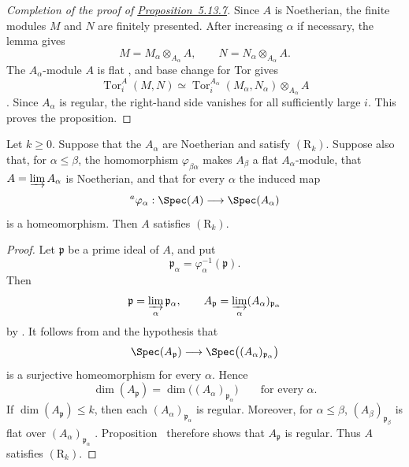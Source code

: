 \begin{proof}[Completion of the proof of {\hyperlink{ega4.c04.prop.5-13-7}{Proposition~5.13.7}}]
Since $A$ is Noetherian, the finite modules $M$ and $N$ are
finitely presented.  After increasing $\alpha$ if necessary, the
lemma gives
\[
  M=M_\alpha\otimes_{A_\alpha}A,
  \qquad
  N=N_\alpha\otimes_{A_\alpha}A.
\]
The $A_\alpha$-module $A$ is flat , and base
change for Tor gives
\[
  \operatorname{Tor}^{A}_i(M,N)
  \simeq
  \operatorname{Tor}^{A_\alpha}_i(M_\alpha,N_\alpha)
  \otimes_{A_\alpha}A
\]
.  Since $A_\alpha$ is regular, the
right-hand side vanishes for all sufficiently large $i$.  This
proves the proposition.
\end{proof}

\begin{corollary}[5.13.8]
\label{IV.5.13.8}
Let $k\geq0$.  Suppose that the $A_\alpha$ are Noetherian and
satisfy $(\mathrm R_k)$.  Suppose also that, for
$\alpha\leq\beta$, the homomorphism $\varphi_{\beta\alpha}$
makes $A_\beta$ a flat $A_\alpha$-module, that
$A=\varinjlim A_\alpha$ is Noetherian, and that for every
$\alpha$ the induced map
\[
  {}^{a}\varphi_\alpha:
  \Spec(A)\longrightarrow\Spec(A_\alpha)
\]
is a homeomorphism.  Then $A$ satisfies $(\mathrm R_k)$.
\end{corollary}

\begin{proof}
Let $\mathfrak p$ be a prime ideal of $A$, and put
\[
  \mathfrak p_\alpha
  =\varphi_\alpha^{-1}(\mathfrak p).
\]
Then
\[
  \mathfrak p=\varinjlim_\alpha\mathfrak p_\alpha,
  \qquad
  A_{\mathfrak p}
  =\varinjlim_\alpha(A_\alpha)_{\mathfrak p_\alpha}
\]
by .  It follows from
 and the hypothesis that
\[
  \Spec(A_{\mathfrak p})
  \longrightarrow
  \Spec\bigl((A_\alpha)_{\mathfrak p_\alpha}\bigr)
\]
is a surjective homeomorphism for every $\alpha$.  Hence
\[
  \dim(A_{\mathfrak p})
  =
  \dim\bigl((A_\alpha)_{\mathfrak p_\alpha}\bigr)
  \qquad\text{for every }\alpha.
\]
If $\dim(A_{\mathfrak p})\leq k$, then each
$(A_\alpha)_{\mathfrak p_\alpha}$ is regular.  Moreover, for
$\alpha\leq\beta$,
$(A_\beta)_{\mathfrak p_\beta}$ is flat over
$(A_\alpha)_{\mathfrak p_\alpha}$ .
Proposition~ therefore shows that
$A_{\mathfrak p}$ is regular.  Thus $A$ satisfies
$(\mathrm R_k)$.
\end{proof}
